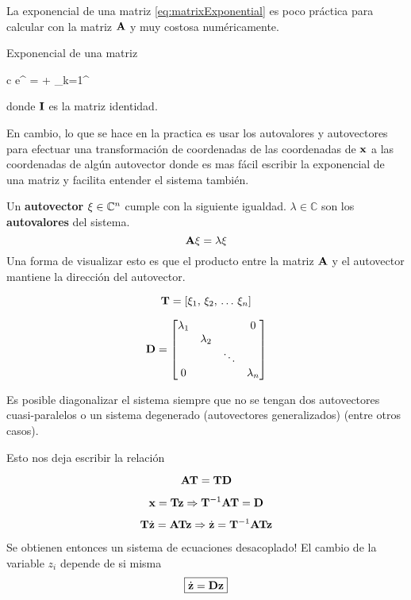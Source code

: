 \documentclass[11pt, a4paper, twoside, openright, openany]{book}
\newcommand{\dimss}{\dimfont{n}}
\begin{document}
La exponencial de una matriz \eqref{eq:matrixExponential} es poco práctica para calcular con la matriz \(\mathbf{A}\) y muy costosa numéricamente.

\begin{definition}{Exponencial de una matriz}
	\begin{IEEEeqnarray}{c}\label{eq:matrixExponential}
	e^{\MX} = \eye + \sum_{k=1}^{\infty} 
	\end{IEEEeqnarray}
donde $\mathbf{I}$ es la matriz identidad.
\end{definition}

En cambio, lo que se hace en la practica es usar los autovalores y autovectores para efectuar una transformación de coordenadas de las coordenadas de $\mathbf{x}$ a las coordenadas de algún autovector donde es mas fácil escribir la exponencial de una matriz y facilita entender el sistema también.

Un \textbf{autovector} $\Cme{\xi}\in\mathbb{C}^\dimss$ cumple con la siguiente igualdad. $\lambda \in \mathbb{C}$ son los \textbf{autovalores} del sistema.
\[
\mathbf{A}\mathbf{\xi} = \lambda \mathbf{\xi}
\]
Una forma de visualizar esto es que el producto entre la matriz $\mathbf{A}$ y el autovector mantiene la dirección del autovector.

\[
\Mme{T} = \left[ \xi_1,\, \xi_2,\, \ldots\, \xi_\dimss \right]
\]

\[
\Mme{D}= \begin{bmatrix}
\lambda_1 & & & 0 \\
 & \lambda_2 & & \\
  & & \ddots & \\
 0 & & & \lambda_\dimss 
\end{bmatrix}
\]

Es posible diagonalizar el sistema siempre que no se tengan dos autovectores cuasi-paralelos o un sistema degenerado (autovectores generalizados) (entre otros casos). 

Esto nos deja escribir la relación

\[
\mathbf{A} \mathbf{T} = \mathbf{T} \mathbf{D}
\]

\[
\mathbf{x} = \mathbf{T}\mathbf{z} \Rightarrow \mathbf{T}^{-1} \mathbf{A} \mathbf{T} = \mathbf{D}
\]

\[
\mathbf{T} \dot{\mathbf{z}} = \mathbf{A} \mathbf{T} \mathbf{z} \Rightarrow \dot{\mathbf{z}} = \mathbf{T}^{-1} \mathbf{A} \mathbf{T} \mathbf{z}
\]

Se obtienen entonces un sistema de ecuaciones desacoplado! El cambio de la variable $z_i$ depende de si misma
\[
\boxed{\dot{\mathbf{z}} = \mathbf{D} \mathbf{z}}
\]
\end{document}
